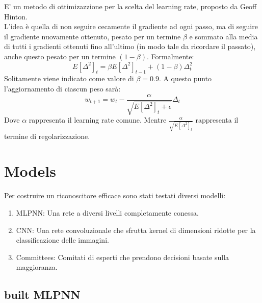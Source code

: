 \documentclass[12pt]{article}
\begin{document}
E' un metodo di ottimizazzione per la scelta del learning rate,
proposto da Geoff Hinton.\\
L'idea è quella di non seguire cecamente il gradiente
ad ogni passo, ma di seguire il gradiente nuovamente ottenuto,
pesato per un termine $\beta$ e sommato alla media di tutti i gradienti
ottenuti fino all'ultimo (in modo tale da ricordare il passato), anche questo
pesato per un termine $(1-\beta)$. Formalmente:
\begin{equation}E[\Delta^2]_t = \beta E[\Delta^2]_{t-1}+(1-\beta)\Delta^2_t\end{equation}
Solitamente viene indicato come valore di $\beta=0.9$.
A questo punto l'aggiornamento di ciascun peso sarà:
\begin{equation}
w_{t+1}=w_t-\frac{\alpha}{\sqrt{E[\Delta^2]_t+\epsilon}}\Delta_t
\end{equation}
Dove $\alpha$ rappresenta il learning rate comune.
Mentre $\frac{\alpha}{\sqrt{E[\Delta^2]_t}}$ rappresenta il termine
di regolarizzazione.



\section{Models}
Per costruire un riconoscitore efficace sono stati testati diversi modelli:
\begin{enumerate}
    \item MLPNN: Una rete a diversi livelli completamente conessa.
    \item CNN\cite{cnn}: Una rete convoluzionale che sfrutta kernel di dimensioni ridotte
               per la classificazione delle immagini.
    \item Committees: Comitati di esperti che prendono decisioni basate sulla maggioranza.
\end{enumerate}



\subsection{built MLPNN}
\end{document}
